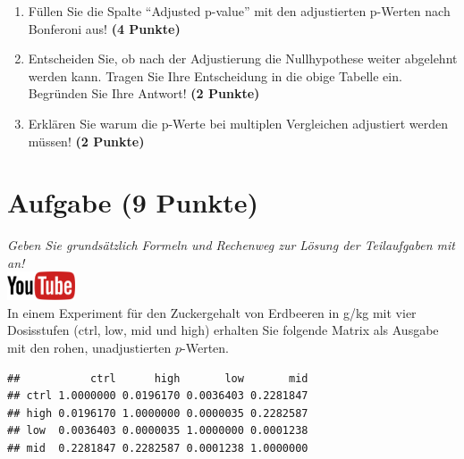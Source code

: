 \documentclass[a4paper, 9pt]{scrartcl}\usepackage[]{graphicx}\usepackage[]{xcolor}
\makeatletter
\newenvironment{kframe}{%
 \def\at@end@of@kframe{}%
 \ifinner\ifhmode%
  \def\at@end@of@kframe{\end{minipage}}%
  \begin{minipage}{\columnwidth}%
 \fi\fi%
 \def\FrameCommand##1{\hskip\@totalleftmargin \hskip-\fboxsep
 \colorbox{shadecolor}{##1}\hskip-\fboxsep
     \hskip-\linewidth \hskip-\@totalleftmargin \hskip\columnwidth}%
 \MakeFramed {\advance\hsize-\width
   \@totalleftmargin\z@ \linewidth\hsize
   \@setminipage}}%
 {\par\unskip\endMakeFramed%
 \at@end@of@kframe}
\newenvironment{knitrout}{}{} %
\makeatother
\begin{document}
\begin{enumerate}
\item F{\"u}llen Sie die Spalte "`Adjusted p-value"' mit den adjustierten
  p-Werten nach Bonferoni aus! \textbf{(4 Punkte)}
\item Entscheiden Sie, ob nach der Adjustierung die Nullhypothese weiter
  abgelehnt werden kann. Tragen Sie Ihre Entscheidung in die obige Tabelle
  ein. Begr{\"u}nden Sie Ihre Antwort! \textbf{(2 Punkte)}
\item Erkl{\"a}ren Sie warum die p-Werte bei multiplen Vergleichen
  adjustiert werden m{\"u}ssen! \textbf{(2 Punkte)}
\end{enumerate}

\vspace{1Ex}

 
\clearpage

\section{Aufgabe \hfill (9 Punkte)}

\textit{Geben Sie grunds{\"a}tzlich Formeln und Rechenweg zur L{\"o}sung der
  Teilaufgaben mit an!} \\[1Ex]

 \hfill\href{https://youtu.be/RagTFFKFbFg}{\includegraphics[width =
   2cm]{img/youtube}}\\[1Ex]



 
 In einem Experiment f{\"u}r den Zuckergehalt von Erdbeeren in g/kg mit vier
 Dosisstufen (ctrl, low, mid und high) erhalten Sie folgende Matrix als
 \Rlogo Ausgabe mit den rohen, unadjustierten $p$-Werten.



\begin{knitrout}
\color{fgcolor}\begin{kframe}
\begin{verbatim}
##           ctrl      high       low       mid
## ctrl 1.0000000 0.0196170 0.0036403 0.2281847
## high 0.0196170 1.0000000 0.0000035 0.2282587
## low  0.0036403 0.0000035 1.0000000 0.0001238
## mid  0.2281847 0.2282587 0.0001238 1.0000000
\end{verbatim}
\end{kframe}
\end{knitrout}
\end{document}
